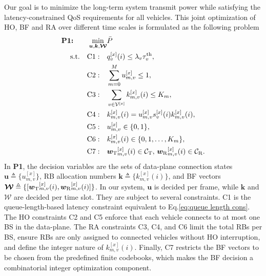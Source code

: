 \documentclass[10pt,journal,letterpaper]{IEEEtran}
\newcommand{\rev}[1]{\textcolor{revisioncolor}{{}#1}}
\newcommand{\omitted}[1]{}
\theoremstyle{remark}
\begin{document}
Our goal is to minimize the long-term system transmit power while satisfying the latency-constrained QoS requirements for all vehicles. This joint optimization of HO, BF and RA over different time scales is formulated as the following problem 
\begin{equation}
    \label{prob1}
    \begin{aligned}
        \textbf{P1:} \qquad  \min_{\bm{u},\bm{k}, \bm{\mathcal{W}}} & \bar{P} \\
        \textup{s.t.} \quad 
        \textup{C1}: \quad & q_v^{[x]}(i) \leq \lambda_v \text{\omitted{}}\rev{\tau_v^{\rm th}}, \\
        \textup{C2}: \quad & \sum_{m=0}^{M} u_{m,v}^{[x]} \leq 1, \\
        \textup{C3}: \quad & \sum_{v\in\mathcal{V}^{[x]}} k_{m,v}^{[x]}(i) \leq K_m, \\
        \textup{C4}: \quad & k_{m,v}^{[x]}(i) = u_{m,v}^{[x]}\rev{s_v^{[x]}(i)}k_{m,v}^{[x]}(i), \\
        \textup{C5}: \quad & u_{m,v}^{[x]} \in \{0,1\}, \\
        \textup{C6}: \quad & k_{m,v}^{[x]}(i) \in \{0,1,\dots,K_m\}, \\
        \textup{C7}: \quad & {\bm{w}_{\rm T}}_{m,v}^{[x]}(i) \in \mathcal{C}_{\rm T}, \, {\bm{w}_{\rm R}}_{m,v}^{[x]}(i) \in \mathcal{C}_{\rm R}.
    \end{aligned}
\end{equation}
In \textbf{P1}, the decision variables are the sets of data-plane connection states $\bm{u} \triangleq \{ u_{m,v}^{[x]} \}$, RB allocation numbers $\bm{k} \triangleq \{ k_{m,v}^{[x]}(i) \}$, and BF vectors $\bm{\mathcal{W}} \triangleq \{ [{\bm{w}_{\rm T}}_{m,v}^{[x]}(i), {\bm{w}_{\rm R}}_{m,v}^{[x]}(i)] \}$. 
In our system, $\bm{u}$ is decided per frame, while $\bm{k}$ and $\bm{\mathcal{W}}$ are decided per time slot.
They are subject to several constraints. 
{C1} is the queue-length-based latency constraint equivalent to Eq.\eqref{eq:queue length cons}. 
The HO constraints {C2} and {C5} enforce that each vehicle connects to at most one BS in the data-plane. 
The RA constraints {C3}, {C4}, and {C6} limit the total RBs per BS, ensure RBs are only assigned to connected vehicles\rev{ without HO interruption}, and define the integer nature of $k_{m,v}^{[x]}(i)$. 
Finally, {C7} restricts the BF vectors to be chosen from the predefined finite codebooks, which makes the BF decision a combinatorial integer optimization component.
\end{document}
